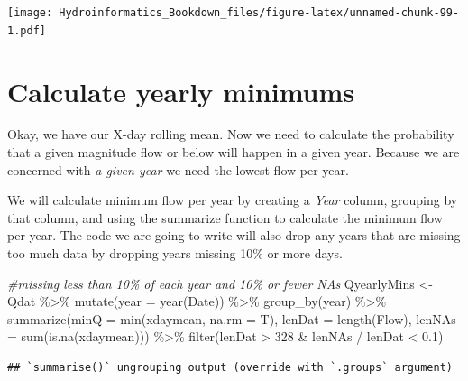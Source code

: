 \documentclass[
]{book}
\newenvironment{Shaded}{\begin{snugshade}}{\end{snugshade}}
\newcommand{\AttributeTok}[1]{\textcolor[rgb]{0.77,0.63,0.00}{#1}}
\newcommand{\CommentTok}[1]{\textcolor[rgb]{0.56,0.35,0.01}{\textit{#1}}}
\newcommand{\DecValTok}[1]{\textcolor[rgb]{0.00,0.00,0.81}{#1}}
\newcommand{\FloatTok}[1]{\textcolor[rgb]{0.00,0.00,0.81}{#1}}
\newcommand{\FunctionTok}[1]{\textcolor[rgb]{0.00,0.00,0.00}{#1}}
\newcommand{\NormalTok}[1]{#1}
\newcommand{\OtherTok}[1]{\textcolor[rgb]{0.56,0.35,0.01}{#1}}
\newcommand{\SpecialCharTok}[1]{\textcolor[rgb]{0.00,0.00,0.00}{#1}}
\begin{document}
\texttt{[image: Hydroinformatics\_Bookdown\_files/figure-latex/unnamed-chunk-99-1.pdf]}

\hypertarget{calculate-yearly-minimums}{%
\section{Calculate yearly minimums}\label{calculate-yearly-minimums}}

Okay, we have our X-day rolling mean. Now we need to calculate the probability that a given magnitude flow or below will happen in a given year. Because we are concerned with \emph{a given year} we need the lowest flow per year.

We will calculate minimum flow per year by creating a \emph{Year} column, grouping by that column, and using the summarize function to calculate the minimum flow per year. The code we are going to write will also drop any years that are missing too much data by dropping years missing 10\% or more days.

\begin{Shaded}
\begin{Highlighting}[]
\CommentTok{\#missing less than 10\% of each year and 10\% or fewer NAs}
\NormalTok{QyearlyMins }\OtherTok{\textless{}{-}}\NormalTok{ Qdat }\SpecialCharTok{\%\textgreater{}\%} \FunctionTok{mutate}\NormalTok{(}\AttributeTok{year =} \FunctionTok{year}\NormalTok{(Date)) }\SpecialCharTok{\%\textgreater{}\%}
                        \FunctionTok{group\_by}\NormalTok{(year) }\SpecialCharTok{\%\textgreater{}\%}
                        \FunctionTok{summarize}\NormalTok{(}\AttributeTok{minQ =} \FunctionTok{min}\NormalTok{(xdaymean, }\AttributeTok{na.rm =}\NormalTok{ T), }
                                  \AttributeTok{lenDat =} \FunctionTok{length}\NormalTok{(Flow),}
                                  \AttributeTok{lenNAs =} \FunctionTok{sum}\NormalTok{(}\FunctionTok{is.na}\NormalTok{(xdaymean))) }\SpecialCharTok{\%\textgreater{}\%}
                        \FunctionTok{filter}\NormalTok{(lenDat }\SpecialCharTok{\textgreater{}} \DecValTok{328} \SpecialCharTok{\&}\NormalTok{ lenNAs }\SpecialCharTok{/}\NormalTok{ lenDat }\SpecialCharTok{\textless{}} \FloatTok{0.1}\NormalTok{) }
\end{Highlighting}
\end{Shaded}

\begin{verbatim}
## `summarise()` ungrouping output (override with `.groups` argument)
\end{verbatim}
\end{document}
